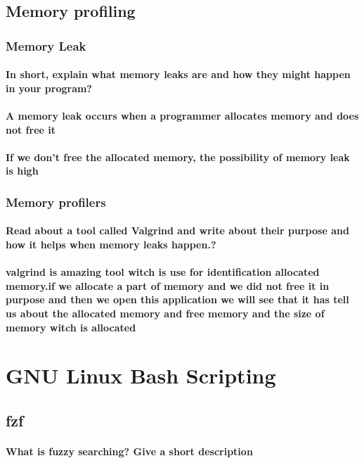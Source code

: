 \documentclass[12pt]{article}
\begin{document}
\subsection{Memory profiling}
\subsubsection{Memory Leak}
\paragraph{In short, explain what memory leaks are and how they might happen in your program?}
\paragraph{A memory leak occurs when a programmer allocates memory and does not free it}
\paragraph{If we don't free the allocated memory, the possibility of memory leak is high}


\subsubsection{Memory profilers}
\paragraph{Read about a tool called Valgrind and write about their purpose and how it helps when memory leaks happen.?}
\paragraph{valgrind is amazing tool witch is use for identification allocated memory.if we allocate a part of memory and we did not free it in purpose and then we open this application we will see that it has tell us about the allocated memory and free memory and the size of memory witch is allocated}
\section{GNU Linux Bash Scripting}
\subsection{fzf}
\paragraph{What is fuzzy searching? Give a short description}
\end{document}
